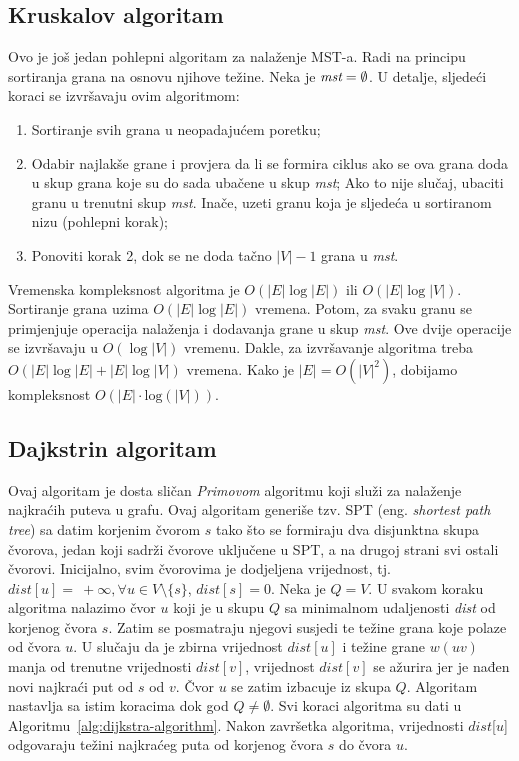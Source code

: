 \documentclass[a4paper, utf8, 11pt, colorlinks]{book}
\begin{document}
\subsection{Kruskalov algoritam}

Ovo je još jedan pohlepni algoritam za nalaženje MST-a. Radi na principu sortiranja 
grana na osnovu njihove težine. Neka je $\emph{mst} = \emptyset$. U detalje, sljedeći koraci se izvršavaju ovim algoritmom:

\begin{enumerate}
	\item Sortiranje svih grana u neopadajućem poretku;
	\item Odabir najlakše grane i provjera da li se formira ciklus ako se ova 
	grana doda u skup grana koje su do sada ubačene u skup \emph{mst}; Ako to nije slučaj, ubaciti granu u trenutni skup \emph{mst}. Inače, uzeti granu koja je sljedeća u sortiranom nizu (pohlepni korak);
	\item Ponoviti korak 2, dok se ne doda tačno $|V|-1$ grana u \emph{mst}.
\end{enumerate} 

\noindent Vremenska kompleksnost algoritma je $O(|E|\log |E|)$ ili $O(|E|\log |V|)$. Sortiranje grana uzima $O(|E| \log|E|)$ vremena. Potom, za svaku granu 
se primjenjuje operacija nalaženja i dodavanja grane u skup \emph{mst}. Ove dvije operacije se izvršavaju u $O(\log |V|)$ vremenu. Dakle, za izvršavanje algoritma treba $O(|E|\log |E| + |E|\log |V|)$ vremena. Kako je $|E|=O(|V|^2)$, dobijamo kompleksnost $O(|E| \cdot \mathrm{log}(|V|))$. 

\subsection{Dajkstrin algoritam}

Ovaj algoritam je dosta sličan \emph{Primovom} algoritmu koji služi za nalaženje najkraćih puteva u grafu. Ovaj algoritam generiše tzv. SPT (eng. \emph{shortest path tree}) sa datim korjenim čvorom $s$ tako  što se formiraju dva disjunktna skupa čvorova, jedan koji sadrži čvorove uključene u SPT, a na drugoj strani svi ostali čvorovi. Inicijalno, svim čvorovima je dodjeljena vrijednost, tj. $dist[u]=\ +\infty, \forall u \in V\setminus \{s\}$, $dist[s]=0$. Neka je $Q = V$. 
U svakom koraku algoritma nalazimo čvor $u$ koji je u skupu $Q$ sa minimalnom udaljenosti \emph{dist} od korjenog čvora $s$. Zatim se posmatraju njegovi susjedi te težine grana koje polaze od čvora $u$. U slučaju da je zbirna vrijednost $dist[u]$  i težine grane $w(uv)$ manja od trenutne vrijednosti $dist[v]$, vrijednost $dist[v]$ se ažurira jer je nađen novi najkraći put od $s$ od $v$.  Čvor $u$ se zatim izbacuje iz skupa $Q$. Algoritam nastavlja sa istim koracima dok god $Q \neq \emptyset$. 
Svi koraci algoritma su dati u Algoritmu~\ref{alg:dijkstra-algorithm}. Nakon završetka algoritma, vrijednosti $dist$[$u$] odgovaraju težini najkraćeg puta od korjenog čvora $s$ do čvora $u$. 
\end{document}
